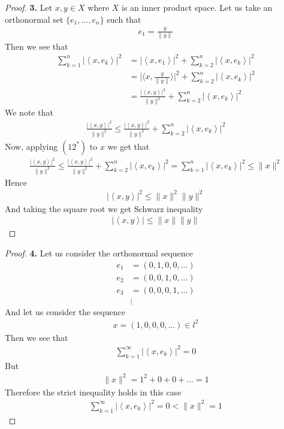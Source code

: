 \documentclass[11pt]{article}
\newcommand{\inprd}[1]{\left\langle{#1}\right\rangle}
\theoremstyle{definition}
\begin{document}
\cleardoublepage
\begin{proof}{\textbf{3.}}
Let $x, y \in X$ where $X$ is an inner product space.
Let us take an orthonormal set $\{e_1, ..., e_n\}$ such that
\begin{align*}
    e_1 = \frac{y}{\|y\|}
\end{align*}
Then we see that
\begin{align*}
    \sum_{k=1}^n |\inprd{x, e_k}|^2
    &= |\inprd{x, e_1}|^2 + \sum_{k=2}^n |\inprd{x, e_k}|^2\\
    &= \bigg|\bigg\langle x, \frac{y}{\|y\|}\bigg\rangle\bigg|^2
    + \sum_{k=2}^n |\inprd{x, e_k}|^2\\
    &= \frac{|\inprd{x, y}|^2}{\|y\|^2}
    + \sum_{k=2}^n |\inprd{x, e_k}|^2
\end{align*}
We note that
\begin{align*}
    \frac{|\inprd{x, y}|^2}{\|y\|^2} \leq \frac{|\inprd{x, y}|^2}{\|y\|^2}
    + \sum_{k=2}^n |\inprd{x, e_k}|^2
\end{align*}
Now, applying $(12^*)$ to $x$ we get that
\begin{align*}
    \frac{|\inprd{x, y}|^2}{\|y\|^2}
    \leq \frac{|\inprd{x, y}|^2}{\|y\|^2}
    + \sum_{k=2}^n |\inprd{x, e_k}|^2 
     = \sum_{k=1}^n |\inprd{x, e_k}|^2 \leq \|x\|^2
\end{align*}
Hence
\begin{align*}
    |\inprd{x, y}|^2 \leq \|x\|^2\|y\|^2
\end{align*}
And taking the square root we get Schwarz inequality
\begin{align*}
    |\inprd{x, y}| \leq \|x\|\|y\|
\end{align*}
\end{proof}

\cleardoublepage
\begin{proof}{\textbf{4.}}
Let us consider the orthonormal sequence
\begin{align*}
    e_1 &= (0, 1, 0, 0, ...)\\
    e_2 &= (0, 0, 1, 0, ...)\\
    e_3 &= (0, 0, 0, 1, ...)\\
    &\vdots
\end{align*}
And let us consider the sequence
\begin{align*}
    x = (1, 0, 0, 0, ...) \in l^2
\end{align*}
Then we see that
\begin{align*}
    \sum_{k=1}^\infty |\inprd{x, e_k}|^2 = 0
\end{align*}
But
\begin{align*}
    \|x\|^2 = 1^2 + 0 + 0 + ... = 1
\end{align*}
Therefore the strict inequality holds in this case
\begin{align*}
    \sum_{k=1}^\infty |\inprd{x, e_k}|^2 = 0 < \|x\|^2 = 1
\end{align*}
\end{proof}
\end{document}
